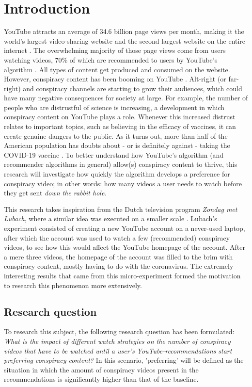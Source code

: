 \documentclass[../main.tex]{subfiles}
\begin{document}
\section{Introduction}
YouTube attracts an average of 34.6 billion page views per month, making it the world's largest
video-sharing website and the second largest website on the entire internet \citep{neufeld_2021}. The
overwhelming majority of those page views come from users watching videos, 70\% of which are recommended
to users by YouTube's algorithm \citep{cooper_2020}. All types of content get produced and consumed on
the website. However, conspiracy content has been booming on YouTube \citep{donzelli2018misinformation}.
Alt-right (or far-right) and conspiracy channels are starting to grow their audiences, which could have
many negative consequences for society at large. For example, the number of people who are distrustful
of science is increasing, a development in which conspiracy content on YouTube plays a role. Whenever
this increased distrust relates to important topics, such as believing in the efficacy of vaccines, it
can create genuine dangers to the public. As it turns out, more than half of the American population has
doubts about - or is definitely against - taking the COVID-19 vaccine \citep{rosenbaum2021escaping}. To
better understand how YouTube's algorithm (and recommender algorithms in general) allow(s) conspiracy
content to thrive, this research will investigate how quickly the algorithm develops a preference for 
conspiracy video; in other words: how many videos a user needs to watch before they get sent 
\textit{down the rabbit hole}. 

This research takes inspiration from the Dutch television program \textit{Zondag met Lubach}, where a
similar idea was executed on a smaller scale \citep{lubach_2020}. Lubach's experiment consisted of 
creating a new YouTube account on a never-used laptop, after which the account was used to watch a few 
(recommended) conspiracy videos, to see how this would affect the YouTube homepage of the account. After
a mere three videos, the homepage of the account was filled to the brim with conspiracy content, mostly 
having to do with the coronavirus. The extremely interesting results that came from this 
micro-experiment formed the motivation to research this phenomenon more extensively. 

\subsection{Research question}
To research this subject, the following research question has been formulated:
\textit{What is the impact of different watch strategies on the number of conspiracy videos that have to
be watched until a user's YouTube-recommendations start preferring conspiracy content?} In this scenario,
'preferring' will be defined as the situation in which the amount of conspiracy videos present in the
recommendations is significantly higher than that of the baseline.
\end{document}
